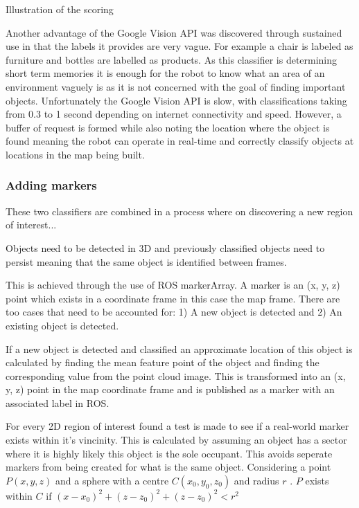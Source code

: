 \documentclass{mproj}
\begin{document}
Illustration of the scoring

Another advantage of the Google Vision API was discovered through sustained use in that the labels it provides are very vague. For example a chair is labeled as furniture and bottles are labelled as products. As this classifier is determining short term memories it is enough for the robot to know what an area of an environment vaguely is as it is not concerned with the goal of finding important objects. Unfortunately the Google Vision API is slow, with classifications taking from 0.3 to 1 second depending on internet connectivity and speed. However, a buffer of request is formed while also noting the location where the object is found meaning the robot can operate in real-time and correctly classify objects at locations in the map being built.



\subsubsection{Adding markers}



These two classifiers are combined in a process where on discovering a new region of interest...

Objects need to be detected in 3D and previously classified objects need to persist meaning that the same object is identified between frames.


This is achieved through the use of ROS markerArray. A marker is an (x, y, z) point which exists in a coordinate frame in this case the map frame. There are too cases that need to be accounted for: 1) A new object is detected and 2) An existing object is detected.


If a new object is detected and classified an approximate location of this object is calculated by finding the mean feature point of the object and finding the corresponding value from the point cloud image. This is transformed into an (x, y, z) point in the map coordinate frame and is published as a marker with an associated label in ROS. 

For every 2D region of interest found a test is made to see if a real-world marker exists within it's vincinity. This is calculated by assuming an object has a sector where it is highly likely this object is the sole occupant. This avoids seperate markers from being created for what is the same object. Considering a point $P (x, y, z)$  and a sphere with a centre $ C (x_{0}, y_{0}, z_{0}) $ and radius $r$ . $P$ exists within $C$ if $(x-x_{0})^{2} +  (z-z_{0})^{2} + (z-z_{0})^{2} <r^2$
\end{document}
